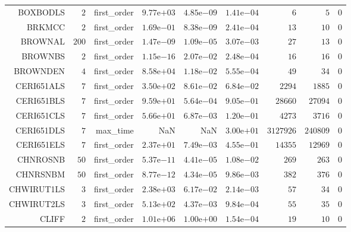 \begin{longtable}{rrrrrrrrr}
BOXBODLS & \(     2\) & first\_order & \( 9.77\)e\(+03\) & \( 4.85\)e\(-09\) & \( 1.41\)e\(-04\) & \(     6\) & \(     5\) & \(     0\) \\
BRKMCC & \(     2\) & first\_order & \( 1.69\)e\(-01\) & \( 8.38\)e\(-09\) & \( 2.41\)e\(-04\) & \(    13\) & \(    10\) & \(     0\) \\
BROWNAL & \(   200\) & first\_order & \( 1.47\)e\(-09\) & \( 1.09\)e\(-05\) & \( 3.07\)e\(-03\) & \(    27\) & \(    13\) & \(     0\) \\
BROWNBS & \(     2\) & first\_order & \( 1.15\)e\(-16\) & \( 2.07\)e\(-02\) & \( 2.48\)e\(-04\) & \(    16\) & \(    16\) & \(     0\) \\
BROWNDEN & \(     4\) & first\_order & \( 8.58\)e\(+04\) & \( 1.18\)e\(-02\) & \( 5.55\)e\(-04\) & \(    49\) & \(    34\) & \(     0\) \\
CERI651ALS & \(     7\) & first\_order & \( 3.50\)e\(+02\) & \( 8.61\)e\(-02\) & \( 6.84\)e\(-02\) & \(  2294\) & \(  1885\) & \(     0\) \\
CERI651BLS & \(     7\) & first\_order & \( 9.59\)e\(+01\) & \( 5.64\)e\(-04\) & \( 9.05\)e\(-01\) & \( 28660\) & \( 27094\) & \(     0\) \\
CERI651CLS & \(     7\) & first\_order & \( 5.66\)e\(+01\) & \( 6.87\)e\(-03\) & \( 1.20\)e\(-01\) & \(  4273\) & \(  3716\) & \(     0\) \\
CERI651DLS & \(     7\) & max\_time &       NaN &       NaN & \( 3.00\)e\(+01\) & \(3127926\) & \(240809\) & \(     0\) \\
CERI651ELS & \(     7\) & first\_order & \( 2.37\)e\(+01\) & \( 7.49\)e\(-03\) & \( 4.55\)e\(-01\) & \( 14355\) & \( 12969\) & \(     0\) \\
CHNROSNB & \(    50\) & first\_order & \( 5.37\)e\(-11\) & \( 4.41\)e\(-05\) & \( 1.08\)e\(-02\) & \(   269\) & \(   263\) & \(     0\) \\
CHNRSNBM & \(    50\) & first\_order & \( 8.77\)e\(-12\) & \( 4.34\)e\(-05\) & \( 9.86\)e\(-03\) & \(   382\) & \(   376\) & \(     0\) \\
CHWIRUT1LS & \(     3\) & first\_order & \( 2.38\)e\(+03\) & \( 6.17\)e\(-02\) & \( 2.14\)e\(-03\) & \(    57\) & \(    34\) & \(     0\) \\
CHWIRUT2LS & \(     3\) & first\_order & \( 5.13\)e\(+02\) & \( 4.37\)e\(-03\) & \( 9.84\)e\(-04\) & \(    55\) & \(    35\) & \(     0\) \\
CLIFF & \(     2\) & first\_order & \( 1.01\)e\(+06\) & \( 1.00\)e\(+00\) & \( 1.54\)e\(-04\) & \(    19\) & \(    10\) & \(     0\) \\

\end{longtable}
